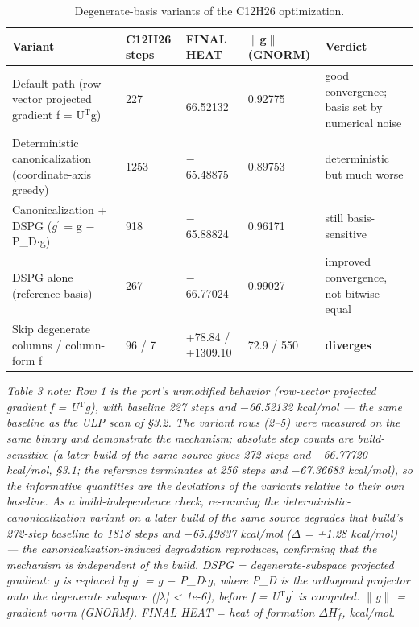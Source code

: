 \documentclass[preprint,12pt]{elsarticle}
\begin{document}
\begin{table}[htbp]
\centering
\caption{Degenerate-basis variants of the C12H26 optimization.}
\label{tab:Degeneratebasisv}
\begin{tabular}{lllll}
\hline
\textbf{Variant} & \textbf{C12H26 steps} & \textbf{FINAL HEAT} & \textbf{$\|$g$\|$ (GNORM)} & \textbf{Verdict} \\
\hline
Default path (row-vector projected gradient f = U$^\mathrm{T}$g) & 227 & $-$66.52132 & 0.92775 & good convergence; basis set by numerical noise \\
Deterministic canonicalization (coordinate-axis greedy) & 1253 & $-$65.48875 & 0.89753 & deterministic but much worse \\
Canonicalization + DSPG ($g^{\prime}$ = g $-$ P\_D$\cdot$g) & 918 & $-$65.88824 & 0.96171 & still basis-sensitive \\
DSPG alone (reference basis) & 267 & $-$66.77024 & 0.99027 & improved convergence, not bitwise-equal \\
Skip degenerate columns / column-form f & 96 / 7 & +78.84 / +1309.10 & 72.9 / 550 & \textbf{diverges} \\
\hline
\end{tabular}
\end{table}

\textit{Table 3 note: Row 1 is the port's unmodified behavior (row-vector projected gradient f = U$^\mathrm{T}$g), with baseline 227 steps and $-$66.52132 kcal/mol --- the same baseline as the ULP scan of \S{}3.2. The variant rows (2--5) were measured on the same binary and demonstrate the mechanism; absolute step counts are build-sensitive (a later build of the same source gives 272 steps and $-$66.77720 kcal/mol, \S{}3.1; the reference terminates at 256 steps and $-$67.36683 kcal/mol), so the informative quantities are the deviations of the variants relative to their own baseline. As a build-independence check, re-running the deterministic-canonicalization variant on a later build of the same source degrades that build's 272-step baseline to 1818 steps and $-$65.49837 kcal/mol ($\Delta$ = +1.28 kcal/mol) --- the canonicalization-induced degradation reproduces, confirming that the mechanism is independent of the build. DSPG = degenerate-subspace projected gradient: g is replaced by $g^{\prime}$ = g $-$ P\_D$\cdot$g, where P\_D is the orthogonal projector onto the degenerate subspace (|$\lambda$| < 1e-6), before f = U$^\mathrm{T}$$g^{\prime}$ is computed. $\|$g$\|$ = gradient norm (GNORM). FINAL HEAT = heat of formation $\Delta H_f^\circ$, kcal/mol.}
\end{document}

